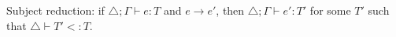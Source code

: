 

\begin{theoremAndi}
Subject reduction: if $\triangle; \Gamma \vdash e : T$ and $e \to e'$,
then $\triangle; \Gamma \vdash e':T'$ for some $T'$ such that $\triangle \vdash T' <: T$.
\end{theoremAndi}

